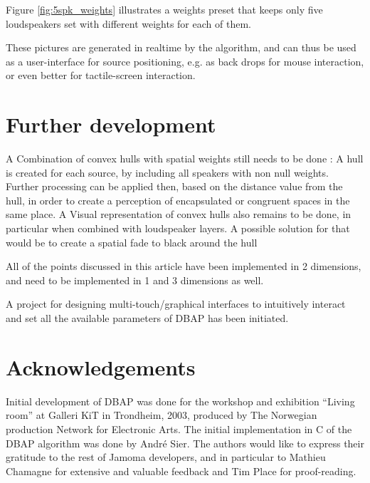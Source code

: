 \documentclass[twoside,10pt]{article}
\begin{document}
Figure \ref{fig:5spk_weights} illustrates a weights preset that keeps only five loudspeakers set with different weights for each of them.

These pictures are generated in realtime by the algorithm, and can thus be used as a user-interface for source positioning, e.g. as back drops for mouse interaction, or even better for tactile-screen interaction.



\section{Further development}


A Combination of convex hulls with spatial weights still needs to be done : A hull is created for each source, by including all speakers with non null weights. Further processing can be applied then, based on the distance value from the hull, in order to create a perception of encapsulated or congruent spaces in the same place.
A Visual representation of convex hulls also remains to be done, in particular when combined with loudspeaker layers. A possible solution for that would be to create a spatial fade to black around the hull 


All of the points discussed in this article have been implemented in 2 dimensions, and need to be implemented in 1 and 3 dimensions as well.  

A project for designing multi-touch/graphical interfaces to intuitively interact and set all the available parameters of DBAP has been initiated.


\section{Acknowledgements}

Initial development of DBAP was done for the workshop and exhibition ``Living room'' at Galleri KiT in Trondheim, 2003, produced by The Norwegian production Network for Electronic Arts. The initial implementation in C of the DBAP algorithm was done by André Sier. The authors would like to express their gratitude to the rest of Jamoma developers, and in particular to Mathieu Chamagne for extensive and valuable feedback and Tim Place for proof-reading. 




\end{document}
